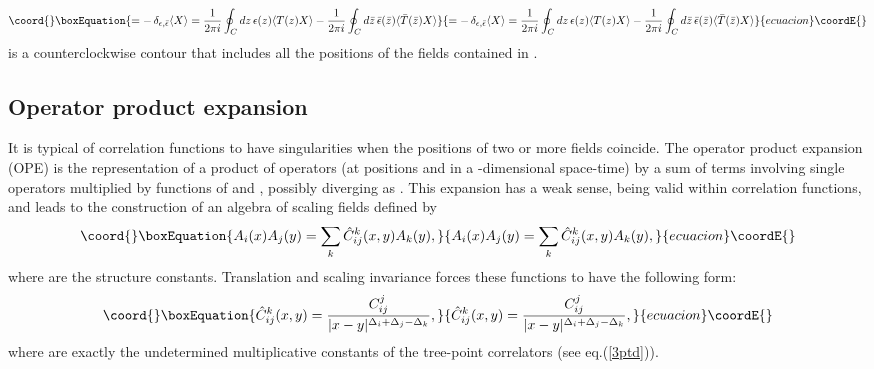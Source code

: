 \documentclass[a4paper,12pt]{report}
\begin{document}
\begin{equation}\coord{}\boxEquation{\label{ward}
=-\,\delta_{\epsilon,\bar{\epsilon}}\langle X\rangle=\frac{1}{2\pi i}\oint_{C} d z \,\epsilon(z)\langle T(z)
X\rangle-\frac{1}{2\pi i}\oint_{C} d \bar{z} \,\bar{\epsilon}(\bar{z})\langle \bar{T}(\bar{z}) X\rangle
}{=-\,\delta_{\epsilon,\bar{\epsilon}}\langle X\rangle=\frac{1}{2\pi i}\oint_{C} d z \,\epsilon(z)\langle T(z)
X\rangle-\frac{1}{2\pi i}\oint_{C} d \bar{z} \,\bar{\epsilon}(\bar{z})\langle \bar{T}(\bar{z}) X\rangle
}{ecuacion}\coordE{}\end{equation}
\coordHE{} is a counterclockwise contour that includes all the positions \coordHE{} of the fields contained
in \coordHE{}.

\subsection{Operator product expansion}

It is typical of correlation functions to have singularities when the positions of two or more fields coincide.
The operator product expansion (OPE) is the representation of a product of operators (at positions \coordHE{} and \coordHE{} in
a \coordHE{}-dimensional space-time) by a sum of terms involving single operators multiplied by functions of \coordHE{} and \coordHE{},
possibly diverging as \coordHE{}. This expansion has a weak sense, being valid within correlation
functions, and leads to the construction of an algebra of scaling fields defined by
\begin{equation}\coord{}\boxEquation{\label{alg}
A_{i}(x)A_{j}(y)=\sum_{k}\hat{C}_{ij}^{k}(x,y)A_{k}(y),
}{A_{i}(x)A_{j}(y)=\sum_{k}\hat{C}_{ij}^{k}(x,y)A_{k}(y),
}{ecuacion}\coordE{}\end{equation}
where \coordHE{} are the structure constants. Translation and scaling invariance forces these
functions to have the following form:
\begin{equation}\coord{}\boxEquation{
\hat{C}_{ij}^{k}(x,y)=\frac{C_{ij}^{j}}{|x-y|^{\Delta_{i}+\Delta_{j}-\Delta_{k}}},
}{
\hat{C}_{ij}^{k}(x,y)=\frac{C_{ij}^{j}}{|x-y|^{\Delta_{i}+\Delta_{j}-\Delta_{k}}},
}{ecuacion}\coordE{}\end{equation}
where \coordHE{} are exactly the undetermined multiplicative constants of the tree-point correlators (see
eq.(\ref{3ptd})).
\end{document}
